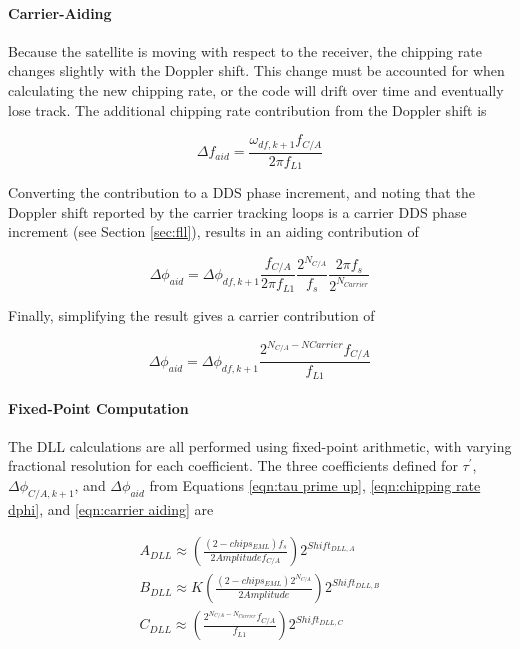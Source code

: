 \documentclass[12pt]{article}
\begin{document}
\paragraph{Carrier-Aiding}
Because the satellite is moving with respect to the receiver, the chipping rate changes slightly with the Doppler shift. This change must be accounted for when calculating the new chipping rate, or the code will drift over time and eventually lose track. The additional chipping rate contribution from the Doppler shift is

\begin{equation*}
\Delta f_{aid} = \frac{\omega_{df,k+1} f_{C/A}}{2 \pi f_{L1}}
\end{equation*}

Converting the contribution to a DDS phase increment, and noting that the Doppler shift reported by the carrier tracking loops is a carrier DDS phase increment (see Section \ref{sec:fll}), results in an aiding contribution of

\begin{equation*}
\Delta \phi_{aid} = \Delta\phi_{df,k+1} \frac{f_{C/A}}{2 \pi f_{L1}} \frac{2^{N_{C/A}}}{f_s} \frac{2 \pi f_s}{2^{N_{Carrier}}}
\end{equation*}

Finally, simplifying the result gives a carrier contribution of

\begin{equation}
\label{eqn:carrier aiding}
\Delta \phi_{aid} = \Delta\phi_{df,k+1} \frac{2^{N_{C/A}-N{Carrier}} f_{C/A}}{f_{L1}}
\end{equation}

\paragraph{Fixed-Point Computation}
\label{sec:fixed-point computation}
The DLL calculations are all performed using fixed-point arithmetic, with varying fractional resolution for each coefficient. The three coefficients defined for  $\tau^\prime$, $\Delta\phi_{C/A,k+1}$, and $\Delta\phi_{aid}$ from Equations \ref{eqn:tau prime up}, \ref{eqn:chipping rate dphi}, and \ref{eqn:carrier aiding} are

\begin{gather*}
A_{DLL} \approx \left( \frac{(2-chips_{EML})f_s}{2 Amplitude f_{C/A}} \right) 2^{Shift_{DLL,A}} \\
B_{DLL} \approx K \left( \frac{(2-chips_{EML}) 2^{N_{C/A}}}{2 Amplitude} \right) 2^{Shift_{DLL,B}} \\
C_{DLL} \approx \left( \frac{2^{N_{C/A}-N_{Carrier}} f_{C/A}}{f_{L1}} \right) 2^{Shift_{DLL,C}}
\end{gather*}
\end{document}
